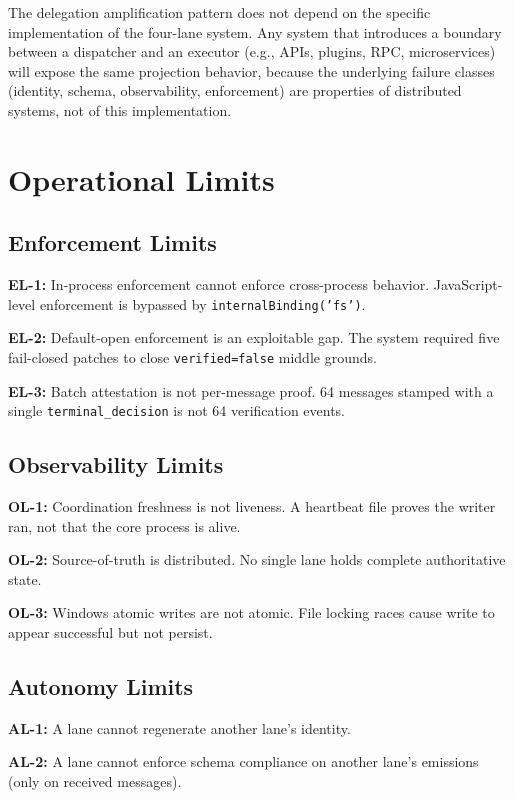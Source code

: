 \documentclass[11pt,letterpaper]{article}
\begin{document}
The delegation amplification pattern does not depend on the specific implementation of the four-lane system. Any system that introduces a boundary between a dispatcher and an executor (e.g., APIs, plugins, RPC, microservices) will expose the same projection behavior, because the underlying failure classes (identity, schema, observability, enforcement) are properties of distributed systems, not of this implementation.

\section{Operational Limits}

\subsection{Enforcement Limits}

\textbf{EL-1:} In-process enforcement cannot enforce cross-process behavior. JavaScript-level enforcement is bypassed by \texttt{internalBinding('fs')}.

\textbf{EL-2:} Default-open enforcement is an exploitable gap. The system required five fail-closed patches to close \texttt{verified=false} middle grounds.

\textbf{EL-3:} Batch attestation is not per-message proof. 64 messages stamped with a single \texttt{terminal\_decision} is not 64 verification events.

\subsection{Observability Limits}

\textbf{OL-1:} Coordination freshness is not liveness. A heartbeat file proves the writer ran, not that the core process is alive.

\textbf{OL-2:} Source-of-truth is distributed. No single lane holds complete authoritative state.

\textbf{OL-3:} Windows atomic writes are not atomic. File locking races cause write to appear successful but not persist.

\subsection{Autonomy Limits}

\textbf{AL-1:} A lane cannot regenerate another lane's identity.

\textbf{AL-2:} A lane cannot enforce schema compliance on another lane's emissions (only on received messages).
\end{document}
